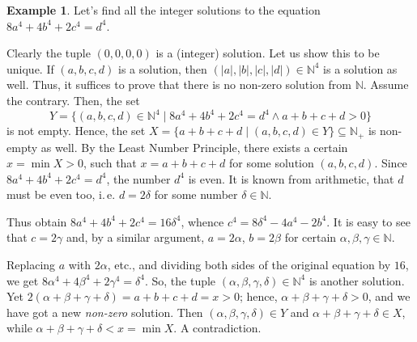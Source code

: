 \documentclass[12pt,notitlepage]{article}
\theoremstyle{plain}
\theoremstyle{definition}
\newtheorem{exm}[thm]{Example}
\theoremstyle{plain}
\newcommand{\N}{\mathbb{N}}
\newcommand{\sbs}{\subseteq}
\newcommand{\1}{\mathbf{1}}
\newcommand{\0}{\mathbf{0}}
\begin{document}
\begin{exm}
Let's find all the integer solutions to the equation $8a^4 + 4b^4 + 2c^4 = d^4$.

Clearly the tuple $(0,0,0,0)$ is a (integer) solution. Let us show this to be unique. If $(a,b,c,d)$ is a solution, then $(|a|,|b|,|c|,|d|) \in \N^4$ is a solution as well. Thus, it suffices to prove that there is no non-zero solution from $\N$. Assume the contrary. Then, the set
$$Y = \{ (a,b,c,d) \in \N^4 \mid 8a^4 + 4b^4 + 2c^4 = d^4 \wedge a+b+c+d > 0\}$$
is not empty. Hence, the set $X = \{ a + b + c + d \mid (a,b,c,d) \in Y \} \sbs \N_+$ is non-empty as well. By the Least Number Principle, there exists a certain $x = \min X > 0$, such that $x = a + b + c +d$ for some solution $(a,b,c,d)$. Since $8a^4 + 4b^4 + 2c^4 = d^4$, the number $d^4$ is even. It is known from arithmetic, that $d$ must be even too, i.\,e. $d = 2\delta$ for some number $\delta \in \N$.

Thus obtain $8a^4 + 4b^4 + 2c^4 = 16\delta^4$, whence $c^4 = 8\delta^4 - 4a^4 - 2b^4$. It is easy to see that $c= 2\gamma$ and, by a similar argument, $a = 2\alpha$, $b = 2\beta$ for certain $\alpha, \beta, \gamma \in \N$. 

Replacing $a$ with $2\alpha$, etc., and dividing both sides of the original equation by $16$, we get $8\alpha^4 + 4\beta^4 + 2\gamma^4 = \delta^4$.  So, the tuple $(\alpha,\beta,\gamma,\delta) \in \N^4$ is another solution. Yet $2(\alpha + \beta + \gamma + \delta) = a + b + c + d = x > 0$; hence, $\alpha + \beta + \gamma + \delta > 0$, and we have got a new \emph{non-zero} solution. Then $(\alpha,\beta,\gamma,\delta) \in Y$ and $\alpha + \beta + \gamma + \delta \in X$, while $\alpha + \beta + \gamma + \delta < x = \min X$. A contradiction.
\end{exm}
\end{document}
